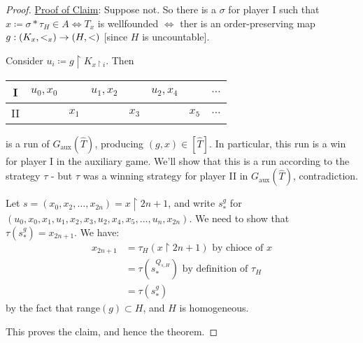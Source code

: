 \documentclass[]{article}
\newcommand{\aux}{\textrm{aux}}
\begin{document}
\begin{proof}

    \underline{Proof of Claim}: Suppose not. So there is a $\sigma$ for player I such that $x \coloneqq \sigma \ast \tau_H \in A \iff T_x$ is wellfounded $\iff$ ther is an order-preserving map $g : (K_x,<_x) \rightarrow (H,<)$ [since $H$ is uncountable].

    Consider $u_i \coloneqq g\restriction K_{x\restriction i}$. Then
    
    \begin{center}
        \begin{tabular}{c|ccccccc}
            I & $u_0,x_0$ & & $u_1,x_2$ & & $u_2,x_4 $& & $\dots $\\ \hline
            II & & $x_1$ & & $x_3 $& &$ x_5$ & $\dots$ 
        \end{tabular}
    \end{center}

    is a run of $G_\aux(\hat{T})$, producing $(g,x)\in [\hat{T}]$. In particular, this run is a win for player I in the auxiliary game. We'll show that this is a run according to the strategy $\tau$ - but $\tau$ was a winning strategy for player II in $G_\aux(\hat{T})$, contradiction.

    Let $s = (x_0,x_2,\dots,x_{2n}) = x\restriction 2n+1$, and write $s^g_\ast$ for $(u_0,x_0,x_1,u_1,x_2,x_3,u_2,x_4,x_5,\dots,u_n,x_{2n})$. We need to show that $\tau(s^g_\ast) = x_{2n+1}$. We have:
    \begin{align*}
        x_{2n+1} &= \tau_H(x\restriction 2n+1)\textrm{ by chioce of }x\\
        &= \tau(s^{Q_{s,H}}_\ast)\textrm{ by definition of }\tau_H\\
        &= \tau(s^g_\ast)
    \end{align*}
    by the fact that range$(g)\subset H$, and $H$ is homogeneous.

    This proves the claim, and hence the theorem.
\end{proof}
\end{document}
